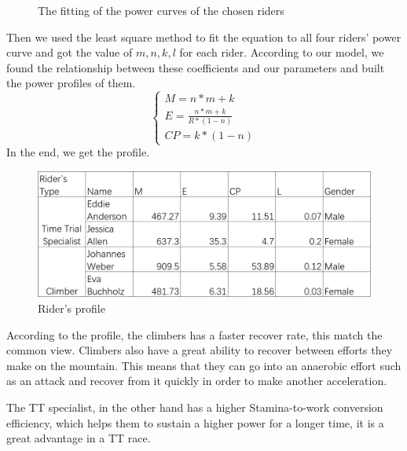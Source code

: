 \documentclass[12pt]{article}
\begin{document}
\begin{figure}[H]
    \centering

    \caption{The fitting of the power curves of the chosen riders}
\end{figure}
Then we used the least square method to fit the equation to all four riders' power curve and  %
got the value of $m,n,k,l$ for each rider. According to our model, we found the relationship between these
coefficients and our parameters and built the power profiles of them.
\begin{equation}
    \left\{
    \begin{array}{c}
        M=n*m+k                 \\
        E=\frac{n*m+k}{R*(1-n)} \\
        CP=k*(1-n)
    \end{array}
    \right.
\end{equation}
In the end, we get the profile.
\begin{figure}
    \centering
    \includegraphics[width=1\columnwidth]{Rider's profile.jpg}
    \caption{Rider's profile}
\end{figure}
According to the profile, the climbers has a faster recover rate, this match the common view. Climbers also have a great ability to recover between efforts they make on
the mountain. This means that they can go into an anaerobic effort such as an attack and recover from it quickly in order to make another acceleration.

The TT specialist, in the other hand has a higher Stamina-to-work conversion efficiency, which helps them to sustain a higher power for a longer time, it is a great advantage
in a TT race.
\end{document}
